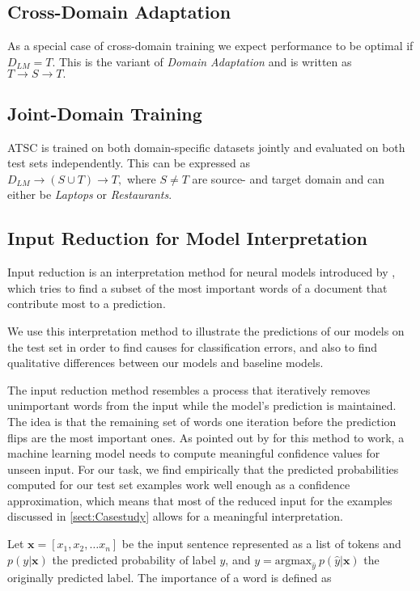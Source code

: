 \documentclass[11pt,a4paper]{article}
\begin{document}
\subsection*{Cross-Domain Adaptation}
As a special case of cross-domain training we expect performance to be optimal if $D_{LM} = T$. This is the variant of \textit{Domain Adaptation} and is written as \\
  $T \rightarrow S \rightarrow T.$
  
\subsection*{Joint-Domain Training} 
ATSC is trained on both domain-specific datasets jointly and evaluated on both test sets independently. This can be expressed as \\$D_{LM} \rightarrow (S \cup T) \rightarrow T,$ where $S\neq T$ are source- and target domain and can either be \textit{Laptops} or \textit{Restaurants}.

\subsection{Input Reduction for Model Interpretation}
\label{sect:Input-reduction}
Input reduction is an interpretation method for neural models introduced by \citet{Feng2018}, which tries to find a subset of the most important words of a document that contribute most to a prediction.

We use this interpretation method to illustrate the predictions of our models on the test set in order to find causes for classification errors, and also to find qualitative differences between our models and baseline models.

The input reduction method resembles a process that iteratively removes unimportant words from the input while the model's  prediction is maintained. The idea is that the remaining set of words one iteration before the prediction flips are the most important ones. 
As pointed out by \citet{Feng2018} for this method to work, a machine learning model needs to compute meaningful confidence values for unseen input. 
For our task, we find empirically that the predicted probabilities computed for our test set examples work well enough as a confidence approximation, which means that most of the reduced input for the examples discussed in  \autoref{sect:Casestudy} allows for a meaningful interpretation.

Let $\textbf{x}=[x_1,x_2, \ldots x_n]$ be the input sentence represented as a list of tokens and $p(y|\textbf{x})$ the predicted probability of label $y$, and $y=\textrm{argmax}_{\hat{y}} \ p(\hat{y}|\textbf{x})$ the originally predicted label.
The importance of a word is defined as 
\end{document}
